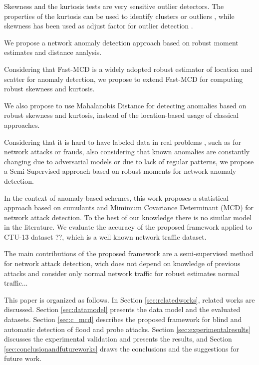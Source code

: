 \documentclass[review]{elsarticle}
\begin{document}
Skewness and the kurtosis tests are very sensitive outlier detectors. The properties of the kurtosis can be used to identify clusters or outliers \cite{pena2010eigenvectors}, while skewness has been used as adjust factor for outlier detection \cite{hubert2008outlier}.

We propose a network anomaly detection approach based on robust moment estimates and distance analysis.

Considering that Fast-MCD is a widely adopted robust estimator of location and scatter for anomaly detection, we propose to extend Fast-MCD for computing robust skewness and kurtosis.

We also propose to use Mahalanobis Distance for detecting anomalies based on robust skewness and kurtosis, instead of the location-based usage of classical approaches.

Considering that it is hard to have labeled data in real problems \cite{osanaiye2016distributed}, such as for network attacks or frauds, also considering that known anomalies are constantly changing due to adversarial models or due to lack of regular patterns, we propose a Semi-Supervised approach based on robust moments for network anomaly detection.


In the context of anomaly-based schemes, this work proposes a statistical approach based on cumulants and Mimimum Covariance Determinant (MCD) for network attack detection. To the best of our knowledge there is no similar model in the literature. We evaluate the accuracy of the proposed framework applied to CTU-13 dataset ??, which is a well known network traffic dataset.

The main contributions of the proposed framework are a semi-supervised method for network attack detection, wich does not depend on knowledge of previous attacks and consider only normal network traffic for robust estimates normal traffic...

This paper is organized as follows. In Section \ref{sec:relatedworks}, related works are discussed. Section \ref{sec:datamodel} presents the data model and the evaluated datasets. Section \ref{sec:c_mcd} describes the proposed framework for blind and automatic detection of flood and probe attacks. Section \ref{sec:experimentalresults} discusses the experimental validation and presents the results, and Section \ref{sec:conclusionandfutureworks} draws the conclusions and the suggestions for future work.

\end{document}
